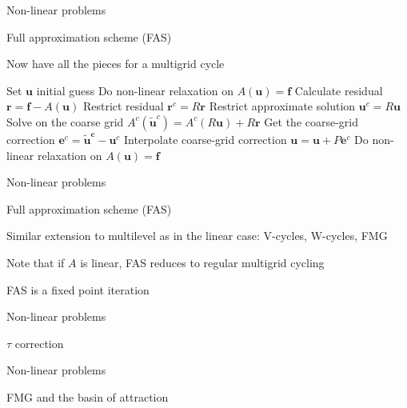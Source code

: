 \documentclass[18pt,xcolor=table]{beamer}
\begin{document}
\begin{frame}{Non-linear problems}
\begin{block}{Full approximation scheme (FAS)}
\bit
\item Now have all the pieces for a multigrid cycle
\begin{algorithm}[H]
\caption{Full approximation scheme (FAS) two-grid cycle}
\begin{algorithmic}
\State Set $\mathbf{u}$ initial guess
\State Do non-linear relaxation on $A(\mathbf{u}) = \mathbf{f}$
\State Calculate residual $\mathbf{r} = \mathbf{f} - A(\mathbf{u})$
\State Restrict residual $\mathbf{r}^c = R\mathbf{r}$
\State Restrict approximate solution $\mathbf{u}^c = R\mathbf{u}$
\State Solve on the coarse grid $A^c(\mathbf{\tilde{u}}^c) = A^c(R\mathbf{u}) + R\mathbf{r}$
\State Get the coarse-grid correction $\mathbf{e}^c = \mathbf{\tilde{u}^c} - \mathbf{u}^c$
\State Interpolate coarse-grid correction $\mathbf{u} = \mathbf{u} + P\mathbf{e}^c$
\State Do non-linear relaxation on $A(\mathbf{u}) = \mathbf{f}$
\end{algorithmic}
\end{algorithm}
\eit
\end{block}
\end{frame}


\begin{frame}{Non-linear problems}
\begin{block}{Full approximation scheme (FAS)}
\bit
\item Similar extension to multilevel as in the linear case: V-cycles, W-cycles, FMG
\item Note that if $A$ is linear, FAS reduces to regular multigrid cycling
\item FAS is a fixed point iteration 
\eit
\end{block}
\end{frame}

\begin{frame}{Non-linear problems}
\begin{block}{$\tau$ correction}
\bit
\item 
\eit
\end{block}
\end{frame}

\begin{frame}{Non-linear problems}
\begin{block}{FMG and the basin of attraction}
\bit
\item 
\eit
\end{block}
\end{frame}
\end{document}
